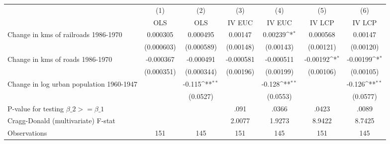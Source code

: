 {
\def\sym#1{\ifmmode^{#1}\else\(^{#1}\)\fi}
\begin{tabular}{l*{6}{c}}
\hline\hline
                &\multicolumn{1}{c}{(1)}&\multicolumn{1}{c}{(2)}&\multicolumn{1}{c}{(3)}&\multicolumn{1}{c}{(4)}&\multicolumn{1}{c}{(5)}&\multicolumn{1}{c}{(6)}\\
                &\multicolumn{1}{c}{OLS}&\multicolumn{1}{c}{OLS}&\multicolumn{1}{c}{IV EUC}&\multicolumn{1}{c}{IV EUC}&\multicolumn{1}{c}{IV LCP}&\multicolumn{1}{c}{IV LCP}\\
\hline
Change in kms of railroads 1986-1970& 0.000305         & 0.000495         &  0.00147         &  0.00239\sym{*}  & 0.000568         &  0.00147         \\
                &(0.000603)         &(0.000589)         &(0.00148)         &(0.00143)         &(0.00121)         &(0.00120)         \\
[1em]
Change in kms of roads 1986-1970&-0.000367         &-0.000491         &-0.000581         &-0.000511         & -0.00192\sym{*}  & -0.00199\sym{*}  \\
                &(0.000351)         &(0.000344)         &(0.00196)         &(0.00199)         &(0.00106)         &(0.00105)         \\
[1em]
Change in log urban population 1960-1947&                  &   -0.115\sym{**} &                  &   -0.128\sym{**} &                  &   -0.126\sym{**} \\
                &                  & (0.0527)         &                  & (0.0553)         &                  & (0.0577)         \\
\hline
P-value for testing $\beta\_{2} >= \beta\_{1}$&                  &                  &     .091         &    .0366         &    .0423         &    .0089         \\
Cragg-Donald (multivariate) F-stat&                  &                  &   2.0077         &   1.9273         &   8.9422         &   8.7425         \\
Observations    &      151         &      145         &      151         &      145         &      151         &      145         \\
\hline\hline
\end{tabular}
}
